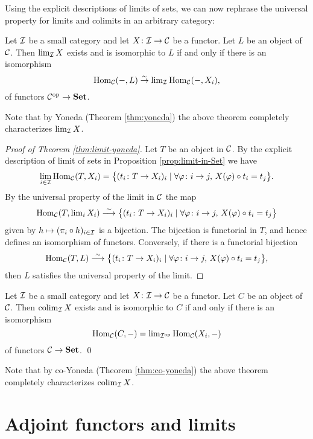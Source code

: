 Using the explicit descriptions of limits  of sets, we can now rephrase the universal property for limits and colimits in an arbitrary category:

\begin{theorem}\label{thm:limit-yoneda}
Let ${\mathcal{I}}$ be a small category and let $X\colon {\mathcal{I}} \to {\mathcal{C}}$ be a functor. Let $L$ be an object of ${\mathcal{C}}$. Then $\lim_{\mathcal{I}} X$ exists and is isomorphic to $L$ if and only if there is an isomorphism
\[
	\operatorname{Hom}_{\mathcal{C}}(-, L) \overset{\sim}{\to} \textstyle\lim_{\mathcal{I}} \operatorname{Hom}_{\mathcal{C}}(-,X_i),
\]
of functors ${\mathcal{C}}^{\mathrm{op}} \to \mathbf{Set}$. \end{theorem}

Note that by Yoneda (Theorem \ref{thm:yoneda})  the above theorem completely characterizes $\lim_{\mathcal{I}} X$. 

\begin{proof}[Proof of Theorem \ref{thm:limit-yoneda}]
Let $T$ be an object in ${\mathcal{C}}$. By the explicit description of limit of sets in Proposition \ref{prop:limit-in-Set}
we have
\[
	\lim_{i\in {\mathcal{I}}} \operatorname{Hom}_{\mathcal{C}}(T,X_i) = \big\{ (t_i\colon T\to X_i)_i \mid \forall \varphi \colon i \to j,\,X(\varphi) \circ t_i = t_j \big\}.
\]
By the universal property of the limit in ${\mathcal{C}}$ the map 
\[
	\operatorname{Hom}_{\mathcal{C}}(T, \textstyle\lim_i X_i) \overset{\sim}{\longrightarrow}
	\big\{ (t_i\colon T\to X_i)_i \mid \forall \varphi \colon i \to j,\,X(\varphi) \circ t_i = t_j \big\}
\]
given by $h \mapsto ( \pi_i \circ h)_{i \in {\mathcal{I}}}$ is a bijection. The bijection is functorial in $T$, and hence defines an isomorphism of functors.
Conversely, if there is a functorial bijection
\[
	\operatorname{Hom}_{\mathcal{C}}(T,L) \overset{\sim}{\longrightarrow}
	\big\{ (t_i\colon T\to X_i)_i \mid \forall \varphi \colon i \to j,\, X(\varphi) \circ t_i = t_j \big\},
\]
then $L$ satisfies the universal property of the limit.
\end{proof}

\begin{theorem}\label{thm:colimit-yoneda}
Let ${\mathcal{I}}$ be a small category and let $X\colon {\mathcal{I}} \to {\mathcal{C}}$ be a functor. Let $C$ be an object of ${\mathcal{C}}$. 
Then $\operatorname{colim}_{\mathcal{I}} X$ exists and is isomorphic to $C$ if and only if there is an isomorphism
\[
	\operatorname{Hom}_{\mathcal{C}}(C, -) = \textstyle\lim_{{\mathcal{I}}^{\mathrm{op}}} \operatorname{Hom}_{\mathcal{C}}(X_i, -)
\]
of functors ${\mathcal{C}}\to \mathbf{Set}$. \qed
\end{theorem}
Note that by co-Yoneda (Theorem \ref{thm:co-yoneda})  the above theorem completely characterizes $\operatorname{colim}_{\mathcal{I}} X$. 


\section{Adjoint functors and limits}




